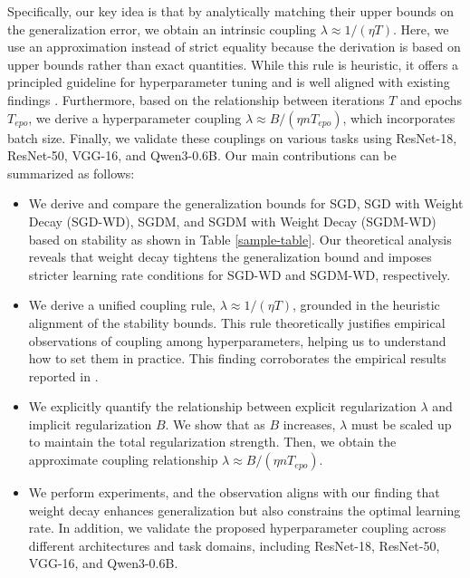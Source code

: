 Specifically, our key idea is that by analytically matching their upper bounds on the generalization error, we obtain an intrinsic coupling $\lambda \approx 1/(\eta T)$. Here, we use an approximation instead of strict equality because the derivation is based on upper bounds rather than exact quantities. While this rule is heuristic, it offers a principled guideline for hyperparameter tuning and is well aligned with existing findings \cite{wang2025setadamwsweightdecay,dangelo2024needweightdecaymodern}. Furthermore, based on the relationship between iterations $T$ and epochs $T_{epo}$, we derive a hyperparameter coupling $\lambda \approx B/(\eta nT_{epo})$, which incorporates batch size. Finally, we validate these couplings on various tasks using ResNet-18, ResNet-50, VGG-16, and Qwen3-0.6B. Our main contributions can be summarized as follows:
\begin{itemize}
    \item We derive and compare the generalization bounds for SGD, SGD with Weight Decay (SGD-WD), SGDM, and SGDM with Weight Decay (SGDM-WD) based on stability as shown in Table \ref{sample-table}. Our theoretical analysis reveals that weight decay tightens the generalization bound and imposes stricter learning rate conditions for SGD-WD and SGDM-WD, respectively. %
    \item We derive a unified coupling rule, $\lambda \approx 1/(\eta T)$, grounded in the heuristic alignment of the stability bounds. This rule theoretically justifies empirical observations of coupling among hyperparameters, helping us to understand how to set them in practice. This finding corroborates the empirical results reported in \cite{wang2025setadamwsweightdecay}.
    \item We explicitly quantify the relationship between explicit regularization $\lambda$ and implicit regularization $B$. We show that as $B$ increases, $\lambda$ must be scaled up to maintain the total regularization strength. Then, we obtain the approximate coupling relationship $\lambda \approx B/(\eta nT_{epo})$.
    \item We perform experiments, and the observation aligns with our finding that weight decay enhances generalization but also constrains the optimal learning rate. In addition, we validate the proposed hyperparameter coupling across different architectures and task domains, including ResNet-18, ResNet-50, VGG-16, and Qwen3-0.6B.
\end{itemize}
